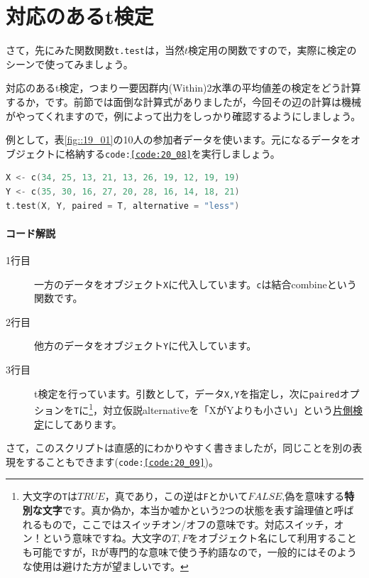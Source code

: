 \documentclass{ltjsbook}
\begin{document}
\section{対応のあるt検定}
さて，先にみた関数関数\texttt{t.test}は，当然$t$検定用の関数ですので，実際に検定のシーンで使ってみましょう。

対応のあるt検定，つまり一要因群内(Within)2水準の平均値差の検定をどう計算するか，です。前節では面倒な計算式がありましたが，今回その辺の計算は機械がやってくれますので，例によって出力をしっかり確認するようにしましょう。

例として，表\ref{fig::19_01}の10人の参加者データを使います。元になるデータをオブジェクトに格納する\texttt{code:\ref{code:20_08}}を実行しましょう。
\begin{lstlisting}[language=c++,label={code:20_08},caption={t検定を行う}]
X <- c(34, 25, 13, 21, 13, 26, 19, 12, 19, 19)
Y <- c(35, 30, 16, 27, 20, 28, 16, 14, 18, 21)
t.test(X, Y, paired = T, alternative = "less")
\end{lstlisting}

\paragraph{コード解説}
\begin{description}
	\item[1行目] 一方のデータをオブジェクト\texttt{X}に代入しています。\texttt{c}は結合combineという関数です。
	\item[2行目] 他方のデータをオブジェクト\texttt{Y}に代入しています。
	\item[3行目] t検定を行っています。引数として，データ\texttt{X,Y}を指定し，次に\texttt{paired}オプションを\texttt{T}に\footnote{大文字の\texttt{T}は$TRUE$，真であり，この逆は\texttt{F}とかいて$FALSE$,偽を意味する\textbf{特別な文字}です。真か偽か，本当か嘘かという2つの状態を表す論理値と呼ばれるもので，ここではスイッチオン/オフの意味です。対応スイッチ，オン！という意味ですね。大文字の$T,F$をオブジェクト名にして利用することも可能ですが，Rが専門的な意味で使う予約語なので，一般的にはそのような使用は避けた方が望ましいです。}，対立仮説alternativeを「XがYよりも小さい」という\underline{片側検定}にしてあります。
\end{description}
さて，このスクリプトは直感的にわかりやすく書きましたが，同じことを別の表現をすることもできます(\texttt{code:\ref{code:20_09}})。
\end{document}
